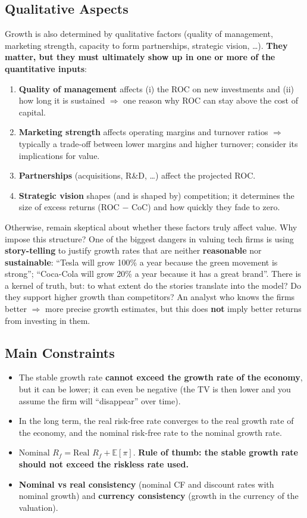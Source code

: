 \subsection{Qualitative Aspects}
Growth is also determined by qualitative factors (quality of management, marketing strength, capacity to form partnerships, strategic vision, \dots). \textbf{They matter, but they must ultimately show up in one or more of the quantitative inputs}:
\begin{enumerate}
  \item \textbf{Quality of management} affects (i) the ROC on new investments and (ii) how long it is sustained $\Rightarrow$ one reason why ROC can stay above the cost of capital.
  \item \textbf{Marketing strength} affects operating margins and turnover ratios $\Rightarrow$ typically a trade-off between lower margins and higher turnover; consider its implications for value.
  \item \textbf{Partnerships} (acquisitions, R\&D, \dots) affect the projected ROC.
  \item \textbf{Strategic vision} shapes (and is shaped by) competition; it determines the size of excess returns (ROC $-$ CoC) and how quickly they fade to zero.
\end{enumerate}
Otherwise, remain skeptical about whether these factors truly affect value. Why impose this structure? One of the biggest dangers in valuing tech firms is using \textbf{story-telling} to justify growth rates that are neither \textbf{reasonable} nor \textbf{sustainable}: ``Tesla will grow 100\% a year because the green movement is strong''; ``Coca-Cola will grow 20\% a year because it has a great brand''. There is a kernel of truth, but: to what extent do the stories translate into the model? Do they support higher growth than competitors? An analyst who knows the firms better $\Rightarrow$ more precise growth estimates, but this does \textbf{not} imply better returns from investing in them.

\subsection{Main Constraints}
\begin{itemize}
  \item The stable growth rate \textbf{cannot exceed the growth rate of the economy}, but it can be lower; it can even be negative (the TV is then lower and you assume the firm will ``disappear'' over time).
  \item In the long term, the real risk-free rate converges to the real growth rate of the economy, and the nominal risk-free rate to the nominal growth rate.
  \item $\text{Nominal } R_f=\text{Real } R_f+\mathbb{E}[\pi]$. \textbf{Rule of thumb: the stable growth rate should not exceed the riskless rate used.}
  \item \textbf{Nominal vs real consistency} (nominal CF and discount rates with nominal growth) and \textbf{currency consistency} (growth in the currency of the valuation).
\end{itemize}

